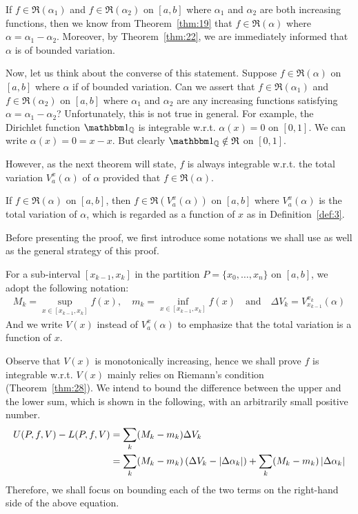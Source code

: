 \documentclass[thmcnt=section, 12pt]{my-elegantbook}
\begin{document}
If $f \in \mathfrak{R}(\alpha_1)$ and $f \in \mathfrak{R}(\alpha_2)$ on $[a, b]$ where $\alpha_1$ and $\alpha_2$ are both increasing functions, then we know from Theorem~\ref{thm:19} that $f \in \mathfrak{R}(\alpha)$ where $\alpha = \alpha_1 - \alpha_2$. Moreover, by Theorem~\ref{thm:22}, we are immediately informed that $\alpha$ is of bounded variation. 

Now, let us think about the converse of this statement. Suppose $f \in \mathfrak{R}(\alpha)$ on $[a, b]$ where $\alpha$ if of bounded variation. Can we assert that $f \in \mathfrak{R}(\alpha_1)$ and $f \in \mathfrak{R}(\alpha_2)$ on $[a, b]$ where $\alpha_1$ and $\alpha_2$ are any increasing functions satisfying $\alpha = \alpha_1 - \alpha_2$? Unfortunately, this is not true in general. For example, the Dirichlet function $\ind_\Q$ is integrable w.r.t. $\alpha(x) = 0$ on $[0, 1]$. We can write $\alpha(x) = 0 = x - x$. But clearly $\ind_\Q \notin \mathfrak{R}$ on $[0, 1]$.

However, as the next theorem will state, $f$ is always integrable 
w.r.t. the total variation $V_a^x(\alpha)$ of $\alpha$ 
provided that $f \in \mathfrak{R}(\alpha)$.

\begin{theorem} \label{thm:37}
    If $f \in \mathfrak{R}(\alpha)$ on $[a, b]$, then $f \in \mathfrak{R}(V_a^x(\alpha))$ on $[a, b]$ where $V_a^x(\alpha)$ is the total variation of $\alpha$, which is regarded as a function of $x$ as in Definition~\ref{def:3}.
\end{theorem}

Before presenting the proof, we first introduce some notations we shall use as well as the general strategy of this proof.

For a sub-interval $[x_{k-1}, x_k]$ in the partition $P = \{ x_0, \ldots, x_n \}$ on $[a, b]$, we adopt the following notation:
\begin{align*}
    M_k = \sup_{x \in [x_{k-1}, x_k]} f(x),
    \quad
    m_k = \inf_{x \in [x_{k-1}, x_k]} f(x)
    \quad\text{and}\quad
    \Delta V_k = V_{x_{k-1}}^{x_k}(\alpha)
\end{align*}
And we write $V(x)$ instead of $V_a^x(\alpha)$ to emphasize that the total variation is a function of $x$.

Observe that $V(x)$ is monotonically increasing, hence we shall prove $f$ is integrable w.r.t. $V(x)$ mainly relies on Riemann's condition (Theorem~\ref{thm:28}). We intend to bound the difference between the upper and the lower sum, which is shown in the following, with an arbitrarily small positive number.
\begin{align*}
    U(P,f,V) - L(P,f,V)
    &= \sum_k (M_k - m_k) \Delta V_k \\ 
    &= \sum_k (M_k - m_k) \left( \Delta V_k - \left\lvert \Delta\alpha_k \right\rvert \right)
    + \sum_k (M_k - m_k) \left\lvert \Delta\alpha_k \right\rvert
\end{align*}
Therefore, we shall focus on bounding each of the two terms on the right-hand side of the above equation.
\end{document}
